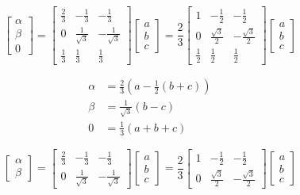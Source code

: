 \documentclass[]{book}
\begin{document}
\[
\begin{bmatrix} \alpha\\ \beta \\ 0 \end{bmatrix}
= \begin{bmatrix} \frac{2}{3} & -\frac{1}{3} & -\frac{1}{3} \\ 0 & \frac{1}{\sqrt{3}} & -\frac{1}{\sqrt{3}} \\ \frac{1}{3} & \frac{1}{3} & \frac{1}{3} \end{bmatrix}
\begin{bmatrix} a\\ b \\ c \end{bmatrix}
= \frac{2}{3} \begin{bmatrix} 1 & -\frac{1}{2} & -\frac{1}{2} \\ 0 & \frac{\sqrt{3}}{2} & -\frac{\sqrt{3}}{2} \\ \frac{1}{2} & \frac{1}{2} & \frac{1}{2} \end{bmatrix}
\begin{bmatrix} a\\ b \\ c \end{bmatrix}
\label{eq:trans3}
\]

\[
\begin{aligned}
\alpha &= \frac{2}{3}(a - \frac{1}{2}(b+c)) \\
\beta &= \frac{1}{\sqrt{3}}(b-c) \\
0 &= \frac{1}{3}(a+b+c)
\end{aligned}
\label{eq:trans1}
\]

\[
\begin{bmatrix} \alpha\\ \beta \end{bmatrix}
= \begin{bmatrix} \frac{2}{3} & -\frac{1}{3} & -\frac{1}{3} \\ 0 & \frac{1}{\sqrt{3}} & -\frac{1}{\sqrt{3}} \end{bmatrix}
\begin{bmatrix} a\\ b \\ c \end{bmatrix}
= \frac{2}{3} \begin{bmatrix} 1 & -\frac{1}{2} & -\frac{1}{2} \\ 0 & \frac{\sqrt{3}}{2} & -\frac{\sqrt{3}}{2} \end{bmatrix}
\begin{bmatrix} a\\ b \\ c \end{bmatrix}
\label{eq:trans2}
\]
\end{document}
